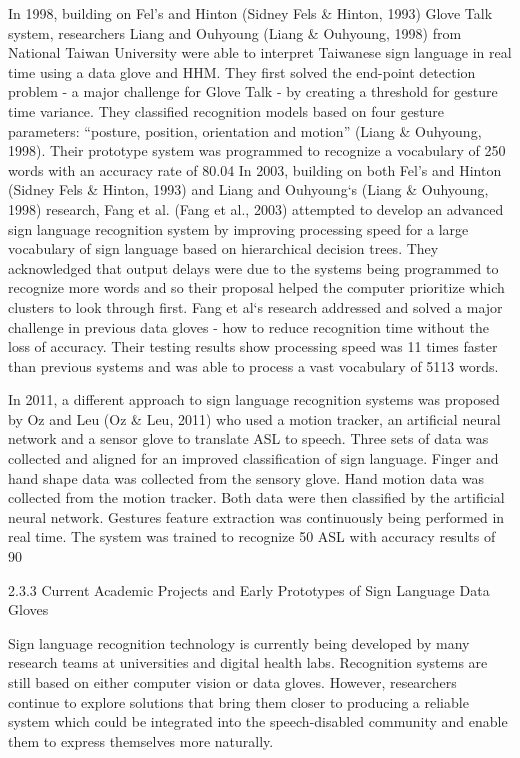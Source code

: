 In 1998, building on Fel’s and Hinton (Sidney Fels \& Hinton, 1993) Glove Talk system, researchers Liang and Ouhyoung (Liang \& Ouhyoung, 1998) from National Taiwan University were able to interpret Taiwanese sign language in real time using a data glove and HHM. They first solved the end-point detection problem - a major challenge for Glove Talk - by creating a threshold for gesture time variance. They classified recognition models based on four gesture parameters: ``posture, position, orientation and motion'' (Liang \& Ouhyoung, 1998). Their prototype system was programmed to recognize a vocabulary of 250 words with an accuracy rate of 80.04%
In 2003, building on both Fel’s and Hinton (Sidney Fels \& Hinton, 1993) and Liang and Ouhyoung‘s (Liang \& Ouhyoung, 1998) research, Fang et al. (Fang et al., 2003) attempted to develop an advanced sign language recognition system by improving processing speed for a large vocabulary of sign language based on hierarchical decision trees. They acknowledged that output delays were due to the systems being programmed to recognize more words and so their proposal helped the computer prioritize which clusters to look through first. Fang et al‘s research addressed and solved a major challenge in previous data gloves - how to reduce recognition time without the loss of accuracy. Their testing results show processing speed was 11 times faster than previous systems and was able to process a vast vocabulary of 5113 words.

In 2011, a different approach to sign language recognition systems was proposed by Oz and Leu (Oz \& Leu, 2011) who used a motion tracker, an artificial neural network and a sensor glove to translate ASL to speech. Three sets of data was collected and aligned for an improved classification of sign language. Finger and hand shape data was collected from the sensory glove. Hand motion data was collected from the motion tracker. Both data were then classified by the artificial neural network. Gestures feature extraction was continuously being performed in real time. The system was trained to recognize 50 ASL with accuracy results of 90%


2.3.3 Current Academic Projects and Early Prototypes of Sign Language Data Gloves 

Sign language recognition technology is currently being developed by many research teams at universities and digital health labs. Recognition systems are still based on either computer vision or data gloves. However, researchers continue to explore solutions that bring them closer to producing a reliable system which could be integrated into the speech-disabled community and enable them to express themselves more naturally.

